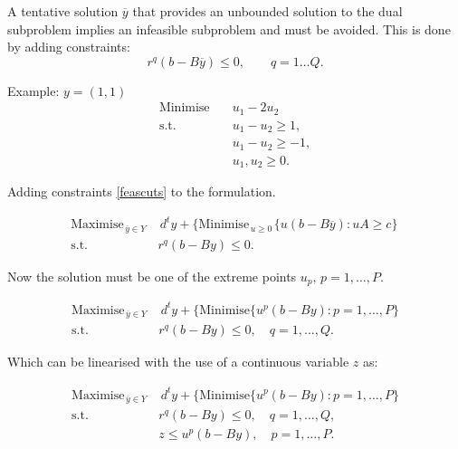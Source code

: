 A tentative solution $\overline{y}$ that provides an unbounded  solution to the dual subproblem  implies an infeasible  subproblem and must be avoided.  This is done by  adding  constraints:
\begin{equation}
\label{feascuts}
r^q(b-B\overline{y}) \leq 0, \qquad q=1 \dots Q.
\end{equation}



\begin{bclogo}[logo=\bccrayon]{\small Example:  $y = (1,1)$ }
\small \vspace{-.5cm}
\begin{align*}
\textrm{Minimise} \quad &  u_1 - 2u_2 \\
\textrm{s.t.} \quad & u_1 -  u_2  \geq 1, \\
& u_1 -u_2 \geq -1, \\
& u_1, u_2 \geq 0.
\end{align*}
\end{bclogo}

Adding  constraints \eqref{feascuts} to the  formulation.
\vspace{-0.5cm}

\begin{align*}
\textrm{Maximise}_{\, \overline{y} \in Y \,}  & \, d^ty + \{ \textrm{Minimise}_{\, u\geq 0 \,} \{ u(b-B\overline{y})
: uA \geq c\}\, \\
\textrm{s.t.} \quad & r^q(b-By) \leq 0.
\end{align*}

Now the solution must be one of the extreme points $u_p, \, p=1,\hdots,P. $
\vspace{-0.5cm}

\begin{align*}
\textrm{Maximise}_{\, \overline{y} \in Y \,}  & \,  d^ty + \{ \textrm{Minimise}\{u^p(b-By): p=1,\hdots,P \} \\
\textrm{s.t.} \quad & r^q(b-By) \leq 0, \quad  q=1,\hdots,Q.
\end{align*}

Which can be linearised with the use of a continuous variable $z$ as:
\vspace{-0.5cm}

\begin{align*}
\textrm{Maximise}_{\, \overline{y} \in Y \,}  & \,  d^ty + \{ \textrm{Minimise}\{u^p(b-By): p=1,\hdots,P \} \\
\textrm{s.t.} \quad & r^q(b-By) \leq 0, \quad  q=1,\hdots,Q,\\
& z \leq u^p(b-By), \quad  p=1,\hdots,P.
\end{align*}




